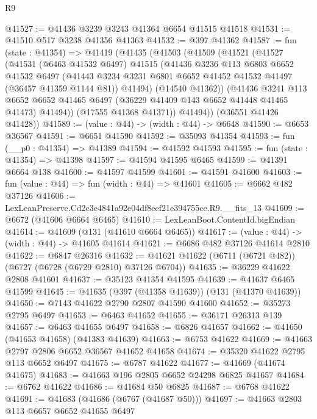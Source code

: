 \begin{lexlean}{R9}
\begin{coremodule}
@41527 := @41436 @3239 @3243 @41364 @6654 @41515 @41518
@41531 := @41510 @517 @3238 @41356 @41363
@41532 := @397 @41362
@41587 := fun (state : @41354) =>
  @41419
    (@41435
      (@41503
        (@41509
          (@41521
            (@41527
              (@41531
                (@6463 @41532 @6497)
                @41515
                (@41436
                  @3236
                  @113
                  @6803
                  @6652
                  @41532
                  @6497
                  (@41443 @3234 @3231 @6801 @6652 @41452 @41532 @41497 (@36457 @41359 @1144 @81))
                  @41494)
                (@14540 @41362))
              (@41436
                @3241
                @113
                @6652
                @6652
                @41465
                @6497
                (@36229 @41409 @143 @6652 @41448 @41465 @41473)
                @41494))
            (@17555 @41368 @41371))
          @41494))
      (@36551 @41426 @41428))
@41589 := (value : @44) -> (width : @44) -> @6648
@41590 := @6653 @36567
@41591 := @6651 @41590
@41592 := @35093 @41354
@41593 := fun (__p0 : @41354) => @41389
@41594 := @41592 @41593
@41595 := fun (state : @41354) => @41398
@41597 := @41594 @41595 @6465
@41599 := @41391 @6664 @138
@41600 := @41597 @41599
@41601 := @41591 @41600
@41603 := fun (value : @44) => fun (width : @44) => @41601
@41605 := @6662 @482 @37126
@41606 := LexLeanPreserve.Cd2c3e4841a92e04df8eef21e394755ce.R9.__fits_13
@41609 := @6672 (@41606 @6664 @6465)
@41610 := LexLeanBoot.ContentId.bigEndian
@41614 := @41609 (@131 (@41610 @6664 @6465))
@41617 := (value : @44) -> (width : @44) -> @41605 @41614
@41621 := @6686 @482 @37126 @41614 @2810
@41622 := @6847 @26316
@41632 := @41621 @41622 (@6711 (@6721 @482)) (@6727 (@6728 (@6729 @2810) @37126 @6704))
@41635 := @36229 @41622 @2808 @41601
@41637 := @35123 @41354 @41595
@41639 := @41637 @6465 @41599
@41645 := @41635 (@397 (@41358 @41639)) (@131 (@41370 @41639))
@41650 := @7143 @41622 @2790 @2807 @41590 @41600
@41652 := @35273 @2795 @6497
@41653 := @6463 @41652
@41655 := @36171 @26313 @139
@41657 := @6463 @41655 @6497
@41658 := @6826 @41657
@41662 := @41650 (@41653 @41658) (@41383 @41639)
@41663 := @6753 @41622
@41669 := @41663 @2797 @2806 @6652 @36567 @41652 @41658
@41674 := @35320 @41622 @2795 @113 @6652 @6497
@41675 := @6787 @41622
@41677 := @41669 (@41674 @41675)
@41683 := @41663 @196 @2805 @6652 @24298 @6825 @41657
@41684 := @6762 @41622
@41686 := @41684 @50 @6825
@41687 := @6768 @41622
@41691 := @41683 (@41686 (@6767 (@41687 @50)))
@41697 := @41663 @2803 @113 @6657 @6652 @41655 @6497

\end{coremodule}
\end{lexlean}
